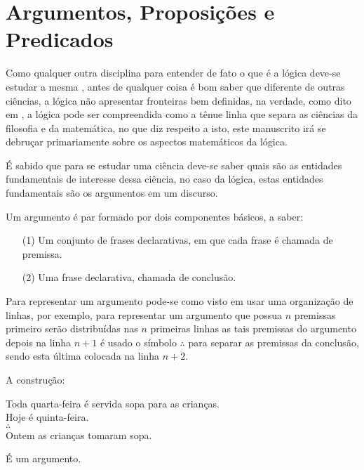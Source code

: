 \section{Argumentos, Proposições e Predicados}\label{sec:LogicsComponents}

Como qualquer outra disciplina para entender de fato o que é a lógica deve-se estudar a mesma \cite{copi1981}, antes de qualquer coisa é bom saber que diferente de outras ciências, a lógica não apresentar fronteiras bem definidas, na verdade, como dito em \cite{joaoPavao2014}, a lógica pode ser compreendida como a tênue linha que separa as ciências da filosofia e da matemática, no que diz respeito a isto, este manuscrito irá se debruçar primariamente sobre os aspectos matemáticos da lógica.

É sabido que para se estudar uma ciência deve-se saber quais são as entidades fundamentais de interesse dessa ciência, no caso da lógica, estas entidades fundamentais são os argumentos em um discurso.

\begin{definicao}[Argumento]\label{def:Argumento}
	Um argumento é par formado por dois componentes básicos, a saber:
	\begin{itemize}
		\item[(1)] Um conjunto de frases declarativas, em que cada frase é chamada de premissa.
		\item[(2)] Uma frase declarativa, chamada de conclusão.
	\end{itemize}
\end{definicao}

Para representar um argumento pode-se como visto em \cite{copi1981, joaoPavao2014} usar uma organização de linhas, por exemplo, para representar um argumento que possua $n$ premissas primeiro serão distribuídas nas $n$ primeiras linhas as tais premissas do argumento depois na linha $n+1$ é usado o símbolo $\wasytherefore$ para separar as premissas da conclusão, sendo esta última colocada na linha $n+2$.

\begin{exemplo}\label{exe:Argumento1}
	A construção:
	\begin{center}
		Toda quarta-feira é servida sopa para as crianças.\\
		Hoje é quinta-feira.\\
		$\wasytherefore$\\
		Ontem as crianças tomaram sopa.
	\end{center}
	É um argumento.
\end{exemplo}

